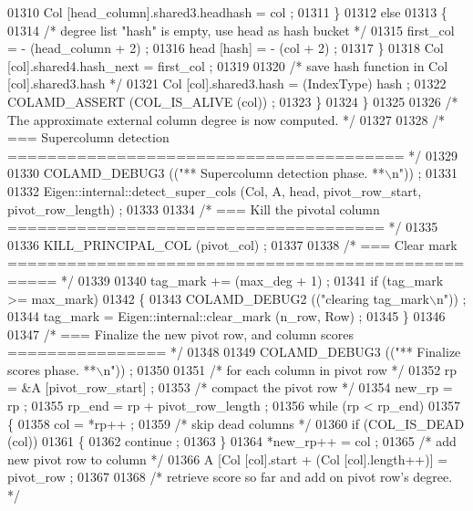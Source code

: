 \begin{DoxyCode}
{{{{{{{{{{{{{{{{{{{{{{{{{{{{01310       Col [head\_column].shared3.headhash = col ;
01311     \}
01312     \textcolor{keywordflow}{else}
01313     \{
01314       \textcolor{comment}{/* degree list "hash" is empty, use head as hash bucket */}
01315       first\_col = - (head\_column + 2) ;
01316       head [hash] = - (col + 2) ;
01317     \}
01318     Col [col].shared4.hash\_next = first\_col ;
01319 
01320     \textcolor{comment}{/* save hash function in Col [col].shared3.hash */}
01321     Col [col].shared3.hash = (IndexType) hash ;
01322     COLAMD\_ASSERT (COL\_IS\_ALIVE (col)) ;
01323       \}
01324     \}
01325 
01326     \textcolor{comment}{/* The approximate external column degree is now computed.  */}
01327 
01328     \textcolor{comment}{/* === Supercolumn detection ======================================== */}
01329 
01330     COLAMD\_DEBUG3 ((\textcolor{stringliteral}{"** Supercolumn detection phase. **\(\backslash\)n"})) ;
01331 
01332     Eigen::internal::detect\_super\_cols (Col, A, head, pivot\_row\_start, pivot\_row\_length) ;
01333 
01334     \textcolor{comment}{/* === Kill the pivotal column ====================================== */}
01335 
01336     KILL\_PRINCIPAL\_COL (pivot\_col) ;
01337 
01338     \textcolor{comment}{/* === Clear mark =================================================== */}
01339 
01340     tag\_mark += (max\_deg + 1) ;
01341     \textcolor{keywordflow}{if} (tag\_mark >= max\_mark)
01342     \{
01343       COLAMD\_DEBUG2 ((\textcolor{stringliteral}{"clearing tag\_mark\(\backslash\)n"})) ;
01344       tag\_mark = Eigen::internal::clear\_mark (n\_row, Row) ;
01345     \}
01346 
01347     \textcolor{comment}{/* === Finalize the new pivot row, and column scores ================ */}
01348 
01349     COLAMD\_DEBUG3 ((\textcolor{stringliteral}{"** Finalize scores phase. **\(\backslash\)n"})) ;
01350 
01351     \textcolor{comment}{/* for each column in pivot row */}
01352     rp = &A [pivot\_row\_start] ;
01353     \textcolor{comment}{/* compact the pivot row */}
01354     new\_rp = rp ;
01355     rp\_end = rp + pivot\_row\_length ;
01356     \textcolor{keywordflow}{while} (rp < rp\_end)
01357     \{
01358       col = *rp++ ;
01359       \textcolor{comment}{/* skip dead columns */}
01360       \textcolor{keywordflow}{if} (COL\_IS\_DEAD (col))
01361       \{
01362     continue ;
01363       \}
01364       *new\_rp++ = col ;
01365       \textcolor{comment}{/* add new pivot row to column */}
01366       A [Col [col].start + (Col [col].length++)] = pivot\_row ;
01367 
01368       \textcolor{comment}{/* retrieve score so far and add on pivot row's degree. */}
}}}}}}}}}}}}}}}}}}}}}}}}}}}}
\end{DoxyCode}
